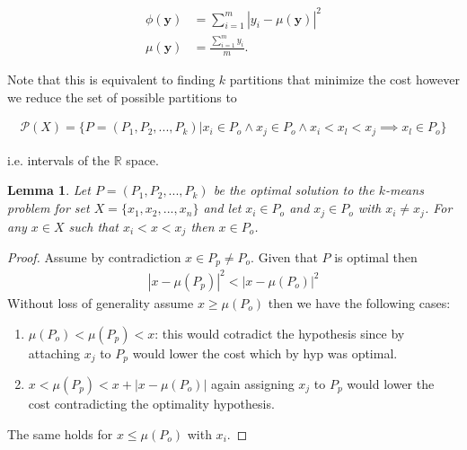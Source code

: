 \documentclass[a4paper]{article}
\newcommand{\abs}[1]{\left\lvert#1\right\rvert}
\newtheorem{lemma}{Lemma}
\begin{document}
\begin{enumerate}
    \begin{align*}
      \phi(\mathbf{y}) &= \sum_{i = 1}^m \abs{y_i - \mu(\mathbf{y})}^2 \\
      \mu(\mathbf{y}) &= \frac{\sum_{i = 1}^m y_i}{m}.
    \end{align*}

    Note that this is equivalent to finding $k$ partitions that minimize the
    cost however we reduce the set of possible partitions to
    
    \begin{align*}
      \mathcal{P}(X) = \{P = (P_1, P_2, ..., P_k) | x_i
    \in P_o \land x_j \in P_o \land x_i < x_l < x_j \implies x_l \in P_o\}
    \end{align*}

    i.e. intervals of the $\mathbb{R}$ space.


    \begin{lemma}
      Let $P = (P_1, P_2, ..., P_k)$ be the optimal solution to the $k$-means
      problem for set $X = \{x_1, x_2, ..., x_n\}$ and let $x_i \in P_o$ and $x_j
      \in P_o$ with $x_i \neq x_j$. For any $x \in X$ such that $x_i < x <
      x_j$ then $x \in P_o$.
    \end{lemma}
    \begin{proof}
      Assume by contradiction $x \in P_p \neq P_o$. Given that $P$ is optimal
      then
      \begin{align*}
        \abs{x - \mu(P_p)}^2 < \abs{x - \mu(P_o)}^2
      \end{align*}
      Without loss of generality assume $x \geq \mu(P_o)$ then we have the
      following cases:
      \begin{enumerate}
        \item $\mu(P_o) < \mu(P_p) < x$: this would cotradict the hypothesis
          since by
        attaching $x_j$ to $P_p$ would lower the cost which by hyp was optimal.

        \item $ x < \mu(P_p) < x + \abs{x - \mu(P_o)} $ again assigning $x_j$ to
          $P_p$ would lower the cost contradicting the optimality hypothesis.
      \end{enumerate}
      The same holds for $x \le \mu(P_o)$ with $x_i$.
    \end{proof}
\end{enumerate}

    \iffalse
    \begin{figure}[!htbp]
    \begin{center}
    \texttt{[image: house.png]}
    \end{center}
    \caption{\textit{The house subgraph}}\label{house}
    \end{figure}
    \fi
\end{document}
